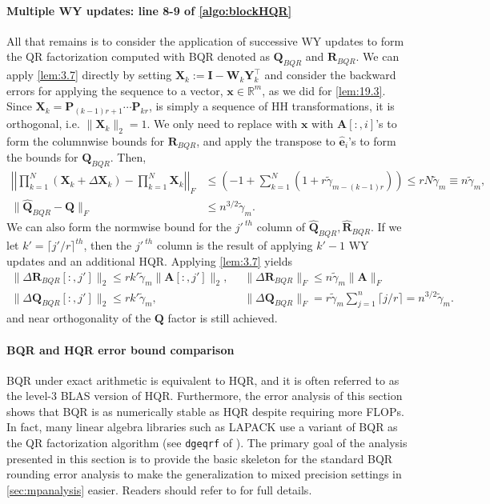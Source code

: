 \documentclass[review,onefignum,onetabnum]{siamart190516}
\newcommand{\R}{\mathbb{R}}
\newcommand{\bb}[1]{\mathbf{#1}}
\begin{document}
\paragraph{Multiple WY updates: line 8-9 of \cref{algo:blockHQR}}
All that remains is to consider the application of successive WY updates to form the QR factorization computed with BQR denoted as $\bb{Q}_{BQR}$ and $\bb{R}_{BQR}$. 
We can apply \cref{lem:3.7} directly by setting $\bb{X}_{k}:= \bb{I}-\bb{W}_{k}\bb{Y}_{k}^{\top}$ and consider the backward errors for applying the sequence to a vector, $\bb{x}\in\R^{m}$, as we did for \cref{lem:19.3}. 
Since $\bb{X}_{k}=\bb{P}_{(k-1)r+1}\cdots\bb{P}_{kr}$, is simply a sequence of HH transformations, it is orthogonal, i.e. $\|\bb{X}_{k}\|_2=1$.
We only need to replace with $\bb{x}$ with $\bb{A}[:,i]$'s to form the columnwise bounds for $\bb{R}_{BQR}$, and apply the transpose to $\hat{\bb{e}}_i$'s to form the bounds for $\bb{Q}_{BQR}$.
Then, 
\begin{align}
\left|\left|\prod_{k=1}^N (\bb{X}_{k} + \Delta \bb{X}_{k})- \prod_{k=1}^N\bb{X}_{k} \right|\right|_F &\leq\left(-1+\sum_{k=1}^N (1+r\tilde{\gamma}_{m-(k-1)r})\right) \leq rN\tilde{\gamma}_m \equiv n\tilde{\gamma}_m ,\label{eqn:BQR-mp}\\
\|\hat{\bb{Q}}_{BQR}-\bb{Q}\|_F&\leq n^{3/2}\tilde{\gamma}_m. \label{eqn:BQR}
\end{align}
We can also form the normwise bound for the $j'^{\ th}$ column of $\hat{\bb{Q}}_{BQR},\hat{\bb{R}}_{BQR}$. 
If we let $k' = \lceil j'/r\rceil^{th}$, then the $j'^{\ th}$ column is the result of applying $k'-1$ WY updates and an additional HQR. 
Applying \cref{lem:3.7} yields 
\begin{align}
\|\Delta \bb{R}_{BQR}[:,j']\|_2 \leq rk'\tilde{\gamma}_{m} \|\bb{A}[:,j']\|_2,&\;\; \|\Delta \bb{R}_{BQR}\|_F \leq n\tilde{\gamma}_{m} \|\bb{A}\|_F\\
\|\Delta \bb{Q}_{BQR}[:,j']\|_2 \leq rk'\tilde{\gamma}_{m},&\;\;\|\Delta \bb{Q}_{BQR}\|_F = r\tilde{\gamma}_{m}\sum_{j=1}^n \lceil j/r\rceil = n^{3/2}\tilde{\gamma}_{m}.\label{eqn:BQRmat}
\end{align}
and near orthogonality of the $\bb{Q}$ factor is still achieved.
\paragraph{BQR and HQR error bound comparison}
BQR under exact arithmetic is equivalent to HQR, and it is often referred to as the level-3 BLAS version of HQR. 
Furthermore, the error analysis of this section shows that BQR is as numerically stable as HQR despite requiring more FLOPs.
In fact, many linear algebra libraries such as LAPACK use a variant of BQR as the QR factorization algorithm (see {\tt dgeqrf} of \cite{LAPACK}).
The primary goal of the analysis presented in this section is to provide the basic skeleton for the standard BQR rounding error analysis to make the generalization to mixed precision settings in \cref{sec:mpanalysis} easier.
Readers should refer to \cite{golub2013matrix,Higham2002} for full details.
%
\end{document}
